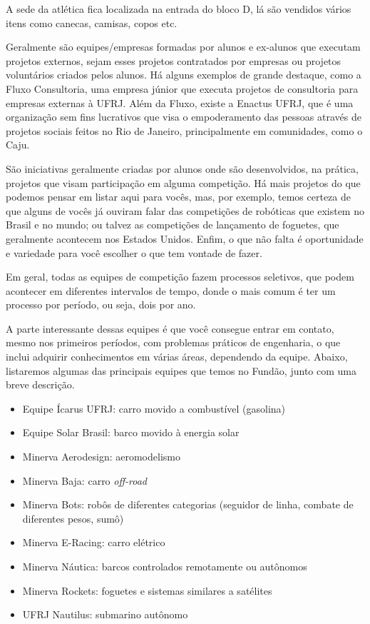 A sede da atlética fica localizada na entrada do bloco D, lá são vendidos vários itens como canecas, camisas, copos etc.

Geralmente são equipes/empresas formadas por alunos e ex-alunos que executam projetos externos, sejam esses projetos contratados por empresas ou projetos voluntários criados pelos alunos. Há alguns exemplos de grande destaque, como a Fluxo Consultoria, uma empresa júnior que executa projetos de consultoria para empresas externas à UFRJ. Além da Fluxo, existe a Enactus UFRJ, que é uma organização sem fins lucrativos que visa o empoderamento das pessoas através de projetos sociais feitos no Rio de Janeiro, principalmente em comunidades, como o Caju.

São iniciativas geralmente criadas por alunos onde são desenvolvidos, na prática, projetos que visam participação em alguma competição. Há mais projetos do que podemos pensar em listar aqui para vocês, mas, por exemplo, temos certeza de que alguns de vocês já ouviram falar das competições de robóticas que existem no Brasil e no mundo; ou talvez as competições de lançamento de foguetes, que geralmente acontecem nos Estados Unidos. Enfim, o que não falta é oportunidade e variedade para você escolher o que tem vontade de fazer.

Em geral, todas as equipes de competição fazem processos seletivos, que podem acontecer em diferentes intervalos de tempo, donde o mais comum é ter um processo por período, ou seja, dois por ano.

A parte interessante dessas equipes é que você consegue entrar em contato, mesmo nos primeiros períodos, com problemas práticos de engenharia, o que inclui adquirir conhecimentos em várias áreas, dependendo da equipe. Abaixo, listaremos algumas das principais equipes que temos no Fundão, junto com uma breve descrição.

\begin{itemize}
\item Equipe Ícarus UFRJ: carro movido a combustível (gasolina)
\item Equipe Solar Brasil: barco movido à energia solar
\item Minerva Aerodesign: aeromodelismo
\item Minerva Baja: carro \textit{off-road}
\item Minerva Bots: robôs de diferentes categorias (seguidor de linha, combate de diferentes pesos, sumô)
\item Minerva E-Racing: carro elétrico
\item Minerva Náutica: barcos controlados remotamente ou autônomos
\item Minerva Rockets: foguetes e sistemas similares a satélites
\item UFRJ Nautilus: submarino autônomo
\end{itemize}


